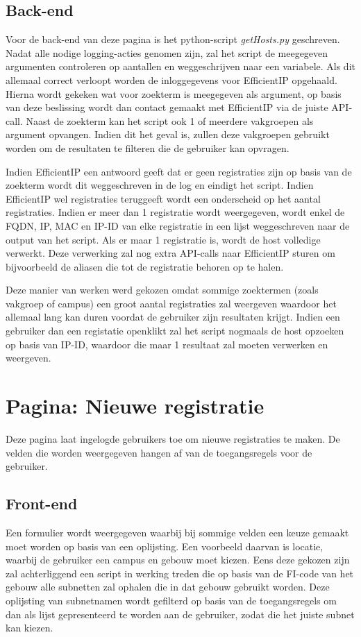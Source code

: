 \subsection{Back-end}
Voor de back-end van deze pagina is het python-script \textit{getHosts.py} geschreven. Nadat alle nodige logging-acties genomen zijn, zal het script de meegegeven argumenten controleren  op aantallen en weggeschrijven naar een variabele. Als dit allemaal correct verloopt worden de inloggegevens voor EfficientIP opgehaald. Hierna wordt gekeken wat voor zoekterm is meegegeven als argument, op basis van deze beslissing wordt dan contact gemaakt met EfficientIP via de juiste API-call. Naast de zoekterm kan het script ook 1 of meerdere vakgroepen als argument opvangen. Indien dit het geval is, zullen deze vakgroepen gebruikt worden om de resultaten te filteren die de gebruiker kan opvragen.

Indien EfficientIP een antwoord geeft dat er geen registraties zijn op basis van de zoekterm wordt dit weggeschreven in de log en eindigt het script. Indien EfficientIP wel registraties teruggeeft wordt een onderscheid op het aantal registraties.
Indien er meer dan 1 registratie wordt weergegeven, wordt enkel de FQDN, IP, MAC en IP-ID van elke registratie in een lijst weggeschreven naar de output van het script. Als er maar 1 registratie is, wordt de host volledige verwerkt. Deze verwerking zal nog extra API-calls naar EfficientIP sturen om bijvoorbeeld de aliasen die tot de registratie behoren op te halen.

Deze manier van werken werd gekozen omdat sommige zoektermen (zoals vakgroep of campus) een groot aantal registraties zal weergeven waardoor het allemaal lang kan duren voordat de gebruiker zijn resultaten krijgt. Indien een gebruiker dan een registatie openklikt zal het script nogmaals de host opzoeken op basis van IP-ID, waardoor die maar 1 resultaat zal moeten verwerken en weergeven.

\section{Pagina: Nieuwe registratie}
\label{nieuwe-registratie}
Deze pagina laat ingelogde gebruikers toe om nieuwe registraties te maken. De velden die worden weergegeven hangen af van de toegangsregels voor de gebruiker.

\subsection{Front-end}
Een formulier wordt weergegeven waarbij bij sommige velden een keuze gemaakt moet worden op basis van een oplijsting.
Een voorbeeld daarvan is locatie, waarbij de gebruiker een campus en gebouw moet kiezen. Eens deze gekozen zijn zal achterliggend een script in werking treden die op basis van de FI-code van het gebouw alle subnetten zal ophalen die in dat gebouw gebruikt worden.
Deze oplijsting van subnetnamen wordt gefilterd op basis van de toegangsregels om dan als lijst gepresenteerd te worden aan de gebruiker, zodat die het juiste subnet kan kiezen. 

